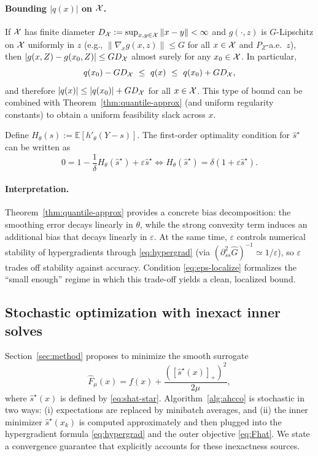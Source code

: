 \documentclass{uai2026} %
\theoremstyle{plain}
\theoremstyle{definition}
\begin{document}
\paragraph{Bounding $|q(x)|$ on $\mathcal{X}$.}
If $\mathcal{X}$ has finite diameter $D_{\mathcal{X}}:=\sup_{x,y\in\mathcal{X}}\|x-y\|<\infty$ and $g(\cdot,z)$ is $G$-Lipschitz on $\mathcal{X}$ uniformly in $z$ (e.g., $\|\nabla_x g(x,z)\|\le G$ for all $x\in\mathcal{X}$ and $P_Z$-a.e.\ $z$), then $|g(x,Z)-g(x_0,Z)|\le GD_{\mathcal{X}}$ almost surely for any $x_0\in\mathcal{X}$.
In particular,
\[
  q(x_0)-GD_{\Xc}\ \le\ q(x)\ \le\ q(x_0)+GD_{\Xc},
\]
and therefore $|q(x)|\le |q(x_0)|+GD_{\mathcal{X}}$ for all $x\in\mathcal{X}$.
This type of bound can be combined with Theorem~\ref{thm:quantile-approx} (and uniform regularity constants) to obtain a uniform feasibility slack across $x$.


Define $H_\theta(s):=\mathbb{E}[h'_\theta(Y-s)]$.
The first-order optimality condition for $\widehat s^\star$ can be written as
\begin{equation}
  0 = 1 - \frac{1}{\delta}H_\theta(\widehat s^\star) + \varepsilon \widehat s^\star
  \Longleftrightarrow
  H_\theta(\widehat s^\star)=\delta(1+\varepsilon \widehat s^\star).\label{eq:Htheta-root}
\end{equation}

\paragraph{Interpretation.}
Theorem~\ref{thm:quantile-approx} provides a concrete bias decomposition: the smoothing error decays linearly in $\theta$, while the strong convexity term induces an additional bias that decays linearly in $\varepsilon$.
At the same time, $\varepsilon$ controls numerical stability of hypergradients through \eqref{eq:hypergrad} (via $(\partial^2_{ss}\widehat G)^{-1}\simeq 1/\varepsilon$), so $\varepsilon$ trades off stability against accuracy.
Condition \eqref{eq:eps-localize} formalizes the ``small enough'' regime in which this trade-off yields a clean, localized bound.

\subsection{Stochastic optimization with inexact inner solves}\label{sec:theory-sgd}
Section~\ref{sec:method} proposes to minimize the smooth surrogate
\[
  \widehat F_\mu(x)= f(x) + \frac{([\widehat s^\star(x)]_+)^2}{2\mu},
\]
where $\widehat s^\star(x)$ is defined by \eqref{eq:shat-star}.
Algorithm~\ref{alg:ahcco} is stochastic in two ways:
(i) expectations are replaced by minibatch averages, and
(ii) the inner minimizer $\widehat s^\star(x_k)$ is computed approximately and then plugged into the hypergradient formula \eqref{eq:hypergrad} and the outer objective \eqref{eq:Fhat}.
We state a convergence guarantee that explicitly accounts for these inexactness sources.
\end{document}
